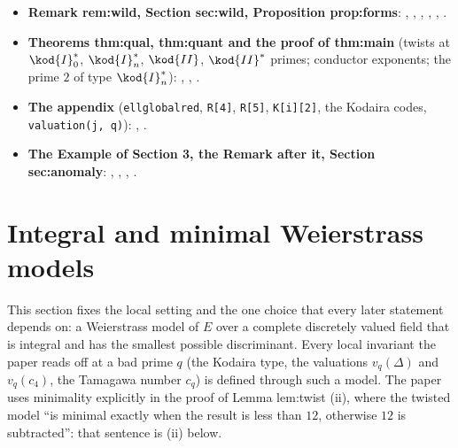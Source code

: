 \begin{itemize}
\item \textbf{Remark rem:wild, Section sec:wild, Proposition prop:forms}: , ,
, , , .
\item \textbf{Theorems thm:qual, thm:quant and the proof of thm:main} (twists at $\kod{I}_0^*$, $\kod{I}_n^*$, $\kod{II}$, $\kod{II}^*$ primes; conductor
exponents; the prime $2$ of type $\kod{I}_n^*$): , ,
.
\item \textbf{The appendix} (\texttt{ellglobalred}, \texttt{R[4]}, \texttt{R[5]}, \texttt{K[i][2]}, the Kodaira codes, \texttt{valuation(j, q)}):
, .
\item \textbf{The Example of Section 3, the Remark after it, Section sec:anomaly}: ,
, , .
\end{itemize}

\section{Integral and minimal Weierstrass models}\label{sec:reduction:minimal}

This section fixes the local setting and the one choice that every later statement depends on: a
Weierstrass model of $E$ over a complete discretely valued field that is integral and has the smallest
possible discriminant. Every local invariant the paper reads off at a bad prime $q$ (the Kodaira type, the
valuations $v_q(\Delta)$ and $v_q(c_4)$, the Tamagawa number $c_q$) is defined through such a model. The
paper uses minimality explicitly in the proof of Lemma lem:twist (ii), where the twisted model ``is minimal
exactly when the result is less than $12$, otherwise $12$ is subtracted'': that sentence is
(ii) below.

